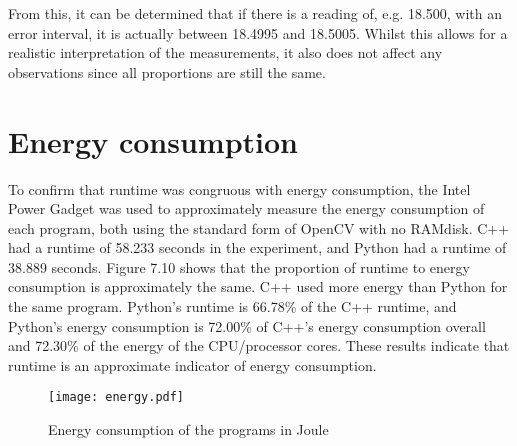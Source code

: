 From this, it can be determined that if there is a reading of, e.g. 18.500, with an error interval, it is actually between 18.4995 and 18.5005. Whilst this allows for a realistic interpretation of the measurements, it also does not affect any observations since all proportions are still the same.

\section{Energy consumption}
To confirm that runtime was congruous with energy consumption, the Intel Power Gadget was used to approximately measure the energy consumption of each program, both using the standard form of OpenCV with no RAMdisk. C++ had a runtime of 58.233 seconds in the experiment, and Python had a runtime of 38.889 seconds.
Figure 7.10 shows that the proportion of runtime to energy consumption is approximately the same. C++ used more energy than Python for the same program. Python’s runtime is 66.78\% of the C++ runtime, and Python’s energy consumption is 72.00\% of C++’s energy consumption overall and 72.30\% of the energy of the CPU/processor cores. These results indicate that runtime is an approximate indicator of energy consumption.

\begin{figure}[H]
	\centering
	\texttt{[image: energy.pdf]}
	\caption{Energy consumption of the programs in Joule}
	\label{figure:energy-consumption}
\end{figure}
